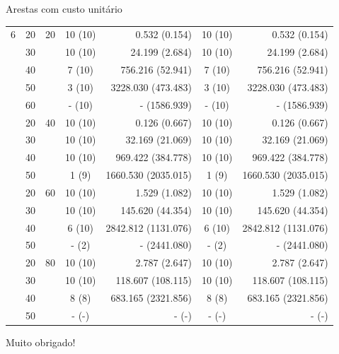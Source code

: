 \documentclass[dvipsnames]{beamer}
\begin{document}
\begin{frame}{Arestas com custo unitário}
{\begin{table}
\begin{tabular}{|c|c|c|>{\columncolor[rgb]{1,1,0}}c|r|>{\columncolor[rgb]{1,1,0}}c|r|}
6 & 20 & 20 & 10 (10) & 0.532 (0.154) & 10 (10) & 0.532 (0.154) \\ 
 & 30 & & 10 (10) & 24.199 (2.684) & 10 (10) & 24.199 (2.684) \\ 
 & 40 & & 7 (10) & 756.216 (52.941) & 7 (10) & 756.216 (52.941) \\ 
 & 50 & & 3 (10) & 3228.030 (473.483) & 3 (10) & 3228.030 (473.483) \\ 
 & 60 & & - (10) & - (1586.939) & - (10) & - (1586.939) \\ 
 & 20 & 40 & 10 (10) & 0.126 (0.667) & 10 (10) & 0.126 (0.667) \\ 
 & 30 & & 10 (10) & 32.169 (21.069) & 10 (10) & 32.169 (21.069) \\ 
 & 40 & & 10 (10) & 969.422 (384.778) & 10 (10) & 969.422 (384.778) \\ 
 & 50 & & 1 (9) & 1660.530 (2035.015) & 1 (9) & 1660.530 (2035.015) \\ 
 & 20 & 60 & 10 (10) & 1.529 (1.082) & 10 (10) & 1.529 (1.082) \\ 
 & 30 & & 10 (10) & 145.620 (44.354) & 10 (10) & 145.620 (44.354) \\ 
 & 40 & & 6 (10) & 2842.812 (1131.076) & 6 (10) & 2842.812 (1131.076) \\ 
 & 50 & & - (2) & - (2441.080) & - (2) & - (2441.080) \\ 
 & 20 & 80 & 10 (10) & 2.787 (2.647) & 10 (10) & 2.787 (2.647) \\ 
 & 30 & & 10 (10) & 118.607 (108.115) & 10 (10) & 118.607 (108.115) \\ 
 & 40 & & 8 (8) & 683.165 (2321.856) & 8 (8) & 683.165 (2321.856) \\ 
 & 50 & & - (-) & - (-) & - (-) & - (-) \\ 


\hline\hline
\end{tabular}
\end{table}
}
  
\end{frame}

\begin{frame}
  Muito obrigado!
\end{frame}
\end{document}
